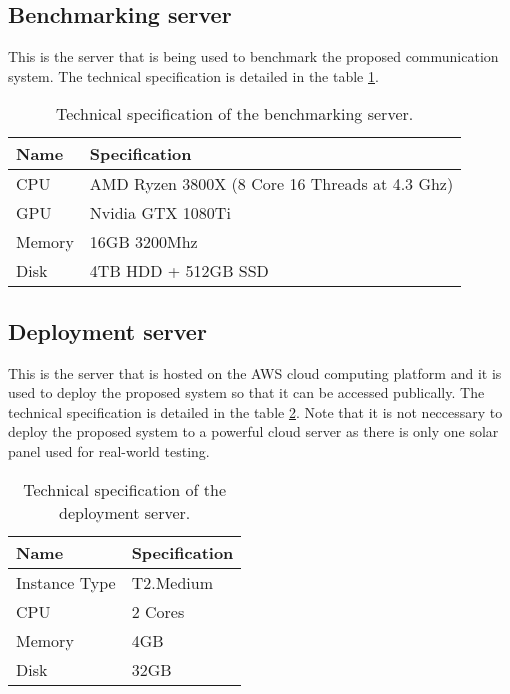 \documentclass[../thesis.tex]{subfiles}
\begin{document}
\subsection{Benchmarking server}
\label{sec:benchmarkingServer}

This is the server that is being used to benchmark the proposed communication system. The technical specification is detailed in the table \ref{tab:benchmarkingHardware}.

\begin{table}[h!]
	\begin{center}
		\caption{Technical specification of the benchmarking server.}
		\label{tab:benchmarkingHardware}
		\begin{tabular}{l|l}
			\toprule
			\textbf{Name} & \textbf{Specification}\\
			\midrule
			CPU & AMD Ryzen 3800X (8 Core 16 Threads at 4.3 Ghz)\\
			GPU & Nvidia GTX 1080Ti\\
			Memory & 16GB 3200Mhz\\
			Disk & 4TB HDD + 512GB SSD\\
			\bottomrule
		\end{tabular}
	\end{center}
\end{table}

\subsection{Deployment server}
\label{sec:deploymentServer}

This is the server that is hosted on the AWS cloud computing platform and it is used to deploy the proposed system so that it can be accessed publically. The technical specification is detailed in the table \ref{tab:deploymentHardware}. Note that it is not neccessary to deploy the proposed system to a powerful cloud server as there is only one solar panel used for real-world testing. 

\begin{table}[h!]
	\begin{center}
		\caption{Technical specification of the deployment server.}
		\label{tab:deploymentHardware}
		\begin{tabular}{l|l}
			\toprule
			\textbf{Name} & \textbf{Specification}\\
			\midrule
			Instance Type & T2.Medium\\
			CPU & 2 Cores\\
			Memory & 4GB\\
			Disk & 32GB\\
			\bottomrule
		\end{tabular}
	\end{center}
\end{table}
\end{document}
